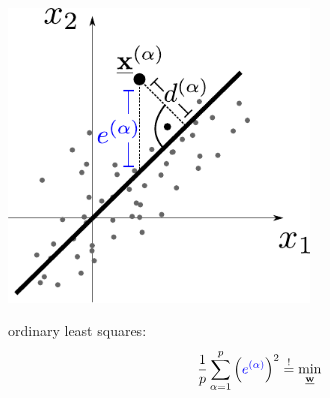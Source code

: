 \begin{frame}\frametitle{\subsubsecname}
	\svspace{-3mm}

\begin{center}
\notesonly{
\hspace{-10mm}
}
\begin{minipage}{0.45\textwidth}
	\begin{center}
		\includegraphics[width=0.6\textwidth]{img/linear_regression}%
	\end{center}
	\svspace{-5mm}
	
	\begin{block}{ordinary least squares:}
	\svspace{-2mm}
		\begin{equation}
		\frac{1}{p} \sum_{\alpha = 1}^{p} \left( {\color{blue}e^{(\alpha)}} \right)^2 \stackrel{\mathrm{!}}{=} \min_{\underline{\mathbf{w}}}
		\end{equation}
	\end{block}
\end{minipage}
\slidesonly{
\hspace{5mm}
}
\notesonly{
\hspace{2mm}
}
\end{center}
\end{frame}
